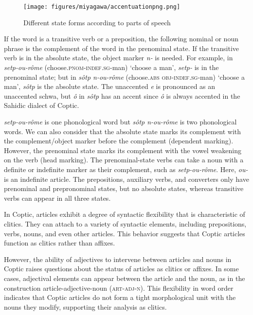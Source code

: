 \documentclass[output=paper,colorlinks,citecolor=brown ,chinesefont]{langscibook}
\begin{document}
\begin{figure}
\texttt{[image: figures/miyagawa/accentuationpng.png]}
\caption{Different state forms according to parts of speech  \citep[566]{miyagawa2}}\label{accentuation}
\end{figure}


If the word is a transitive verb or a preposition, the following nominal or noun phrase is the complement of the word in the prenominal state. If the transitive verb is in the absolute state, the object marker  \textit{n-} is needed. For example, in  \textit{setp-ou-rôme} (choose.\textsc{pnom-indef.sg}-man) ‘choose a man’,  \textit{setp-} is in the prenominal state; but in  \textit{sôtp n-ou-rôme} (choose.\textsc{abs obj-indef.sg}-man) ‘choose a man’,  \textit{sôtp} is the absolute state. The unaccented  \textit{e} is pronounced as an unaccented schwa, but  \textit{ô} in  \textit{sôtp} has an accent since  \textit{ô} is always accented in the Sahidic dialect of Coptic. 


 \textit{setp-ou-rôme} is one phonological word but   \textit{sôtp n-ou-rôme} is two phonological words. We can also consider that the absolute state marks its complement with the complement/object marker before the complement (dependent marking). However, the prenominal state marks its complement with the vowel weakening on the verb (head marking). The prenominal-state verbs can take a noun with a definite or indefinite marker as their complement, such as  \textit{setp-ou-rôme}. Here,  \textit{ou-} is an indefinite article. The prepositions, auxiliary verbs, and converters only have prenominal and prepronominal states, but no absolute states, whereas transitive verbs can appear in all three states.


In Coptic, articles exhibit a degree of syntactic flexibility that is characteristic of clitics. They can attach to a variety of syntactic elements, including prepositions, verbs, nouns, and even other articles. This behavior suggests that Coptic articles function as clitics rather than affixes.

However, the ability of adjectives to intervene between articles and nouns in Coptic raises questions about the status of articles as clitics or affixes. In some cases, adjectival elements can appear between the article and the noun, as in the construction article-adjective-noun (\textsc{art-adj-n}). This flexibility in word order indicates that Coptic articles do not form a tight morphological unit with the nouns they modify, supporting their analysis as clitics.
\end{document}
